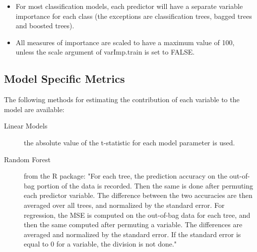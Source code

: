 \documentclass[caret-main.tex]{subfiles}
\begin{document}
\begin{itemize}
\item For most classification models, each predictor will have a separate variable importance for each class (the exceptions are classification trees, bagged trees and boosted trees).
\item All measures of importance are scaled to have a maximum value of 100, unless the scale argument of varImp.train is set to FALSE.
\end{itemize}

\subsection{Model Specific Metrics}
 
The following methods for estimating the contribution of each variable to the model are available:
 

\begin{description}
\item[Linear Models] the absolute value of the t-statistic for each model parameter is used.
\item[Random Forest] from the R package: "For each tree, the prediction accuracy on the out-of-bag portion of the data is recorded. Then the same is done after permuting each predictor variable. The difference between the two accuracies are then averaged over all trees, and normalized by the standard error. For regression, the MSE is computed on the out-of-bag data for each tree, and then the same computed after permuting a variable. The differences are averaged and normalized by the standard error. If the standard error is equal to 0 for a variable, the division is not done."
\end{description} 
\end{document}
